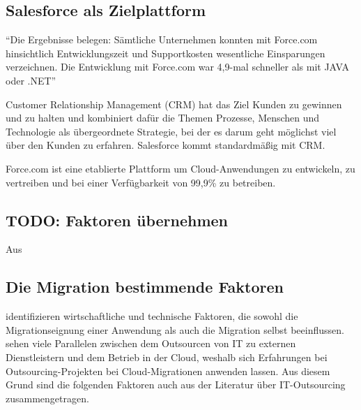 \subsection{Salesforce als Zielplattform}
\label{cha:salesforce_als_zielplattform}
"`Die Ergebnisse belegen: Sämtliche Unternehmen konnten mit Force.com
hinsichtlich Entwicklungszeit und Supportkosten wesentliche Einsparungen
verzeichnen. Die Entwicklung mit Force.com war 4,9-mal schneller als mit JAVA
oder .NET"' 

Customer Relationship Management (CRM) hat das Ziel Kunden zu gewinnen und zu
halten  und kombiniert dafür die Themen Prozesse, Menschen und Technologie als
übergeordnete Strategie, bei der es darum geht möglichst viel über den Kunden
zu erfahren. Salesforce kommt standardmäßig mit CRM.

Force.com ist eine etablierte Plattform um Cloud-Anwendungen zu entwickeln, zu
vertreiben und bei einer Verfügbarkeit von 99,9\% zu betreiben.


\subsection{TODO: Faktoren übernehmen}
Aus 

\subsection{Die Migration bestimmende Faktoren}
\label{cha:migration_bestimmende_faktoren}
 identifizieren wirtschaftliche und technische Faktoren,
die sowohl die Migrationseignung einer Anwendung als auch die Migration selbst
beeinflussen. \\
 sehen viele
Parallelen zwischen dem Outsourcen von IT zu externen
Dienstleistern und dem Betrieb in der Cloud, weshalb sich Erfahrungen bei
Outsourcing-Projekten bei Cloud-Migrationen
anwenden lassen. Aus diesem Grund sind die folgenden Faktoren auch aus der
Literatur über IT-Outsourcing zusammengetragen.
